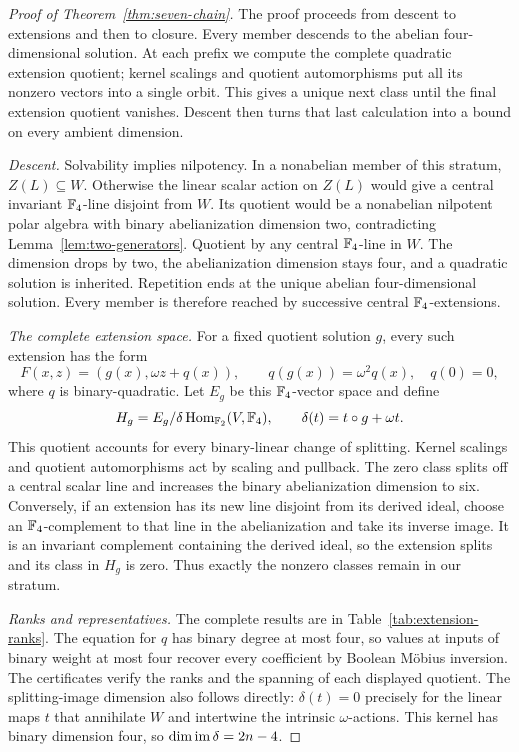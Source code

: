 \begin{proof}[Proof of Theorem~\ref{thm:seven-chain}]
The proof proceeds from descent to extensions and then to closure.
Every member descends to the abelian four-dimensional solution.
At each prefix we compute the complete quadratic extension quotient;
kernel scalings and quotient automorphisms put all its nonzero vectors
into a single orbit. This gives a unique next class until the final
extension quotient vanishes. Descent then turns that last calculation
into a bound on every ambient dimension.

\emph{Descent.}
Solvability implies nilpotency. In a nonabelian member of this stratum,
\(Z(L)\subseteq W\). Otherwise the linear scalar action on \(Z(L)\)
would give a central invariant \(\mathbb F_4\)-line disjoint from \(W\).
Its quotient would be a nonabelian nilpotent polar algebra with
binary abelianization dimension two, contradicting
Lemma~\ref{lem:two-generators}.
Quotient by any central \(\mathbb F_4\)-line in \(W\). The dimension drops
by two, the abelianization dimension stays four, and a quadratic
solution is inherited. Repetition ends at the unique abelian
four-dimensional solution. Every member is therefore reached by
successive central \(\mathbb F_4\)-extensions.

\emph{The complete extension space.}
For a fixed quotient solution \(g\), every such extension has the form
\[
 F(x,z)=(g(x),\omega z+q(x)),\qquad
 q(g(x))=\omega^2q(x),\quad q(0)=0,
\]
where \(q\) is binary-quadratic.
Let \(E_g\) be this \(\mathbb F_4\)-vector space and define
\begin{equation}\label{eq:extension-quotient}
 H_g=E_g/\delta\operatorname{Hom}_{\mathbb F_2}(V,\mathbb F_4),\qquad
 \delta(t)=t\circ g+\omega t.
\end{equation}
This quotient accounts for every binary-linear change of splitting.
Kernel scalings and quotient automorphisms act by scaling and pullback.
The zero class splits off a central scalar line and increases the
binary abelianization dimension to six.
Conversely, if an extension has its new line disjoint from its derived
ideal, choose an \(\mathbb F_4\)-complement to that line in the abelianization
and take its inverse image. It is an invariant complement containing
the derived ideal, so the extension splits and its class in \(H_g\)
is zero. Thus exactly the nonzero classes remain in our stratum.

\emph{Ranks and representatives.}
The complete results are in Table~\ref{tab:extension-ranks}.
The equation for \(q\) has binary degree at most four, so values at
inputs of binary weight at most four recover every coefficient by
Boolean M\"obius inversion. The certificates verify the ranks and
the spanning of each displayed quotient. The splitting-image dimension
also follows directly: \(\delta(t)=0\) precisely for the linear
maps \(t\) that annihilate \(W\) and intertwine the intrinsic
\(\omega\)-actions. This kernel has binary dimension four, so
\(\dim\operatorname{im}\delta=2n-4\).


\end{proof}
